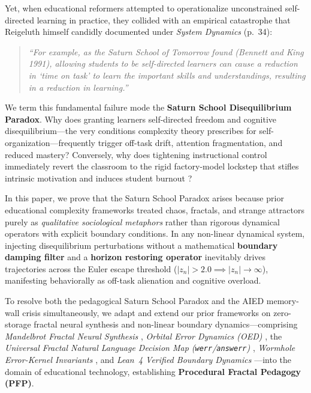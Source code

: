 \documentclass[10pt,twocolumn,a4paper]{article}
\begin{document}
Yet, when educational reformers attempted to operationalize unconstrained self-directed learning in practice, they collided with an empirical catastrophe that Reigeluth himself candidly documented under \textit{System Dynamics} (p.~34):

\begin{quote}
\small
\textit{``For example, as the Saturn School of Tomorrow found (Bennett and King 1991), allowing students to be self-directed learners can cause a reduction in `time on task' to learn the important skills and understandings, resulting in a reduction in learning.''} \cite[p.~34]{reigeluth2008chaos}
\end{quote}

We term this fundamental failure mode the \textbf{Saturn School Disequilibrium Paradox}. Why does granting learners self-directed freedom and cognitive disequilibrium---the very conditions complexity theory prescribes for self-organization---frequently trigger off-task drift, attention fragmentation, and reduced mastery? Conversely, why does tightening instructional control immediately revert the classroom to the rigid factory-model lockstep that stifles intrinsic motivation and induces student burnout \cite{sweller1988cognitive}?

In this paper, we prove that the Saturn School Paradox arises because prior educational complexity frameworks treated chaos, fractals, and strange attractors purely as \textit{qualitative sociological metaphors} rather than rigorous dynamical operators with explicit boundary conditions. In any non-linear dynamical system, injecting disequilibrium perturbations without a mathematical \textbf{boundary damping filter} and a \textbf{horizon restoring operator} inevitably drives trajectories across the Euler escape threshold ($|z_n| > 2.0 \implies |z_n| \to \infty$), manifesting behaviorally as off-task alienation and cognitive overload.

To resolve both the pedagogical Saturn School Paradox and the AIED memory-wall crisis simultaneously, we adapt and extend our prior frameworks on zero-storage fractal neural synthesis and non-linear boundary dynamics---comprising \textit{Mandelbrot Fractal Neural Synthesis} \cite{dagli2026mandelbrot}, \textit{Orbital Error Dynamics (OED)} \cite{dagli2026oed}, the \textit{Universal Fractal Natural Language Decision Map (\texttt{werr}/\texttt{answerr})} \cite{dagli2026werr}, \textit{Wormhole Error-Kernel Invariants} \cite{dagli2026pagecurve}, and \textit{Lean~4 Verified Boundary Dynamics} \cite{dagli2026lean4,dagli2026werracle}---into the domain of educational technology, establishing \textbf{Procedural Fractal Pedagogy (PFP)}.
\end{document}
